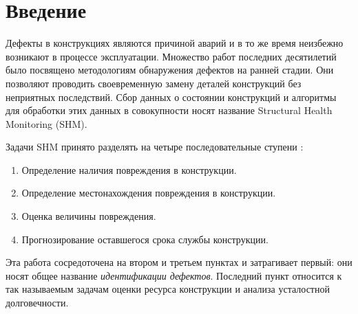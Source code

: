 \documentclass[a4paper,12pt]{article}
\theoremstyle{remark}
\begin{document}
	\tableofcontents
	
	\newpage
	\section{Введение}
	Дефекты в конструкциях являются причиной аварий и в то же время неизбежно возникают в процессе эксплуатации. Множество работ последних десятилетий было посвящено методологиям обнаружения дефектов на ранней стадии. Они позволяют проводить своевременную замену деталей конструкций без неприятных последствий. Сбор данных о состоянии конструкций и алгоритмы для обработки этих данных в совокупности носят название Structural Health Monitoring (SHM).
	
	Задачи SHM принято разделять на четыре последовательные ступени  \cite{review}:
	\begin{enumerate}[itemsep=0cm, topsep=0.2cm]
		\item Определение наличия повреждения в конструкции.
		\item Определение местонахождения повреждения в конструкции.
		\item Оценка величины повреждения.
		\item Прогнозирование оставшегося срока службы конструкции.
	\end{enumerate}
	
	Эта работа сосредоточена на втором и третьем пунктах и затрагивает первый: они носят общее название \textit{идентификации дефектов}. Последний пункт относится к так называемым задачам оценки ресурса конструкции и анализа усталостной долговечности.
	
\end{document}
